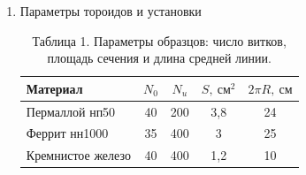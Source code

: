 \documentclass[a4paper]{article}
\begin{document}
\begin{enumerate}
\begin{enumerate}
    \item Снимем часть этого напряжения с делителя с коэффициентом деления $K_{\mathrm{д}} = 1/10$ или $1/100$ и подадим на вход $Y$ ЭО.
    
    \item Подключим мультиметр $V$ к тем же клеммам делителя и измерим эффективное напряжение $U_{\mathrm{эф}}$.
    
    \item На экране ЭО появится вертикальная прямая. Измерим её длину $2y$ в делениях.
    
    \item Рассчитаем чувствительность канала $Y$ по формуле:
    \[
    K_Y = \frac{2\sqrt{2} U_{\mathrm{эф}}}{2y} \quad [\text{В/дел}].
    \]
    
    \item Сравним полученное значение $K_Y$ с выбранным коэффициентом усиления канала $Y$.
    
    \item Оценим погрешности измерения амплитуд с помощью ЭО.
    
    \item Повторим проверку для всех значений $K_X$ и $K_Y$, которые использовались в работе.

\item Повторим данный алгоритм для 3-х тороидов.
\end{enumerate}
\subsection{Полученные данные}

\item Параметры тороидов и установки

\begin{table}[h!]
    \centering
    \begin{tabular}{|l|c|c|c|c|}
        \hline
        Материал & $N_0$ & $N_u$ & $S,\ \text{см}^2$ & $2\pi R,\ \text{см}$ \\ \hline
        Пермаллой нп50 & 40 & 200 & 3{,}8 & 24 \\ \hline
        Феррит нн1000 & 35 & 400 & 3 & 25 \\ \hline
        Кремнистое железо & 40 & 400 & 1{,}2 & 10 \\ \hline
    \end{tabular}
    \caption{Таблица 1. Параметры образцов: число витков, площадь сечения и длина средней линии.}
    \label{tab:geometry_params}
\end{table}


\end{enumerate}
\end{document}
